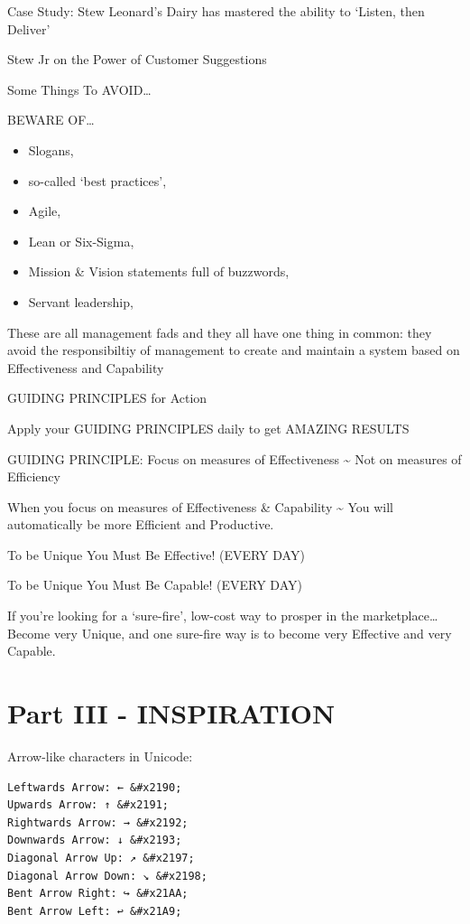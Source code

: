 \documentclass[
]{book}
\providecommand{\tightlist}{%
  \setlength{\itemsep}{0pt}\setlength{\parskip}{0pt}}
\begin{document}
Case Study: Stew Leonard's Dairy has mastered the ability to `Listen, then Deliver'

Stew Jr on the Power of Customer Suggestions

Some Things To AVOID\ldots{}

BEWARE OF\ldots{}

\begin{itemize}
\tightlist
\item
  Slogans,
\item
  so-called `best practices',
\item
  Agile,
\item
  Lean or Six-Sigma,
\item
  Mission \& Vision statements full of buzzwords,
\item
  Servant leadership,
\end{itemize}

These are all management fads and they all have one thing in common: they avoid the responsibiltiy of management to create and maintain a system based on Effectiveness and Capability

GUIDING PRINCIPLES for Action

Apply your GUIDING PRINCIPLES daily to get AMAZING RESULTS

GUIDING PRINCIPLE: Focus on measures of Effectiveness \textasciitilde{} Not on measures of Efficiency

When you focus on measures of Effectiveness \& Capability \textasciitilde{} You will automatically be more Efficient and Productive.

To be Unique You Must Be Effective! (EVERY DAY)

To be Unique You Must Be Capable! (EVERY DAY)

If you're looking for a `sure-fire', low-cost way to prosper in the marketplace\ldots{} Become very Unique, and one sure-fire way is to become very Effective and very Capable.

\hypertarget{part-part-iii---inspiration}{%
\part*{Part III - INSPIRATION}\label{part-part-iii---inspiration}}


Arrow-like characters in Unicode:

\begin{verbatim}
Leftwards Arrow: ← &#x2190;
Upwards Arrow: ↑ &#x2191;
Rightwards Arrow: → &#x2192;
Downwards Arrow: ↓ &#x2193;
Diagonal Arrow Up: ↗ &#x2197;
Diagonal Arrow Down: ↘ &#x2198;
Bent Arrow Right: ↪ &#x21AA;
Bent Arrow Left: ↩ &#x21A9;
\end{verbatim}
\end{document}
